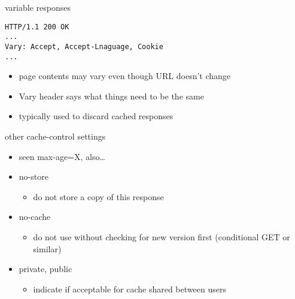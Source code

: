 \begin{frame}[fragile]{variable responses}
\begin{Verbatim}
HTTP/1.1 200 OK
...
Vary: Accept, Accept-Lnaguage, Cookie
...
\end{Verbatim}
\begin{itemize}
\item page contents may vary even though URL doesn't change
\item Vary header says what things need to be the same
\item typically used to discard cached responses
\end{itemize}
\end{frame}

\begin{frame}[fragile]{other cache-control settings}
\begin{itemize}
\item seen max-age=X, also\ldots
\item no-store
    \begin{itemize}
    \item do not store a copy of this response
    \end{itemize}
\item no-cache
    \begin{itemize}
    \item do not use without checking for new version first (conditional GET or similar)
    \end{itemize}
\item private, public
    \begin{itemize}
    \item indicate if acceptable for cache shared between users
    \end{itemize}
\end{itemize}
\end{frame}
